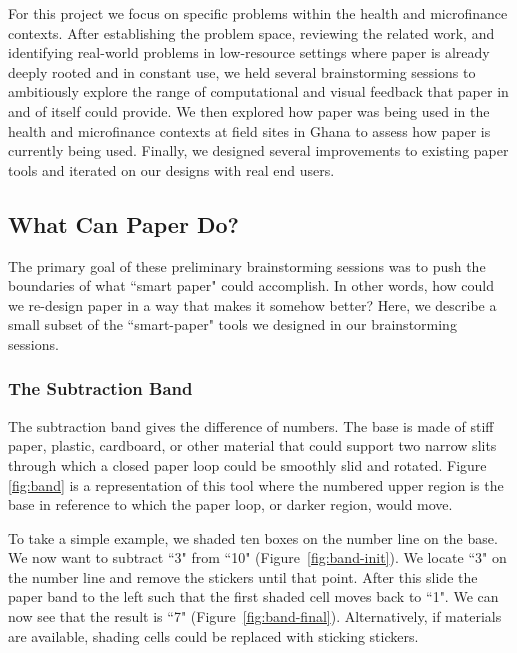 \documentclass{sig-alternate}
\begin{document}
For this project we focus on specific problems within the health and microfinance contexts. After establishing the problem space, reviewing the related work, and identifying real-world problems in low-resource settings where paper is already deeply rooted and in constant use, we held several brainstorming sessions to ambitiously explore the range of computational and visual feedback that paper in and of itself could provide. We then explored how paper was being used in the health and microfinance contexts at field sites in Ghana to assess how paper is currently being used. Finally, we designed several improvements to existing paper tools and iterated on our designs with real end users.

\subsection{What Can Paper Do?}

The primary goal of these preliminary brainstorming sessions was to push the boundaries of what ``smart paper" could accomplish. In other words, how could we re-design paper in a way that makes it somehow better? Here, we describe a small subset of the ``smart-paper" tools we designed in our brainstorming sessions.

\subsubsection{The Subtraction Band}

The subtraction band gives the difference of numbers. The base is made of stiff paper, plastic, cardboard, or other material that could support two narrow slits through which a closed paper loop could be smoothly slid and rotated. Figure \ref{fig:band} is a representation of this tool where the numbered upper region is the base in reference to which the paper loop, or darker region, would move.

To take a simple example, we shaded ten boxes on the number line on the base. We now want to subtract ``3" from ``10" (Figure~\ref{fig:band-init}). We locate ``3" on the number line and remove the stickers until that point. After this slide the paper band to the left such that the first shaded cell moves back to ``1". We can now see that the result is ``7" (Figure~\ref{fig:band-final}). Alternatively, if materials are available, shading cells could be replaced with sticking stickers.
\end{document}
